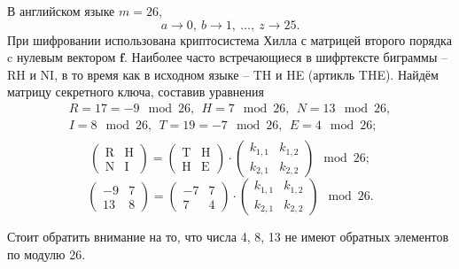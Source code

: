 \example В английском языке $m = 26$,
    \[ a \rightarrow 0, ~ b \rightarrow 1, ~ \dots, ~ z \rightarrow 25. \]
При шифровании использована криптосистема Хилла с матрицей второго порядка c нулевым вектором $\mathbf{f}$. Наиболее часто встречающиеся в шифртексте биграммы -- RH и NI, в то время как в исходном языке -- TH и HE (артикль THE). Найдём матрицу секретного ключа, составив уравнения
\[
    \begin{array}{l}
        R = 17 = -9 \mod 26, ~~ H = 7 \mod 26, ~~ N = 13 \mod 26, \\
        I = 8 \mod 26, ~~ T = 19 = -7 \mod 26, ~~ E=4 \mod 26; \\
    \end{array}
\] \[
    \left( \begin{array}{cc}
        \text{R} & \text{H} \\
        \text{N} & \text{I}
    \end{array} \right) =
    \left( \begin{array}{cc}
        \text{T} & \text{H} \\
        \text{H} & \text{E}
    \end{array} \right) \cdot
    \left( \begin{array}{cc}
        k_{1,1} & k_{1,2} \\
        k_{2,1} & k_{2,2}
    \end{array} \right) \mod 26;
\] \[
    \left( \begin{array}{cc}
        -9 & 7 \\
        13 & 8
    \end{array} \right) =
    \left( \begin{array}{cc}
        -7 & 7 \\
        7 & 4
    \end{array} \right) \cdot
    \left( \begin{array}{cc}
        k_{1,1} & k_{1,2} \\
        k_{2,1} & k_{2,2}
    \end{array} \right) \mod 26.
\]

Стоит обратить внимание на то, что числа 4, 8, 13 не имеют обратных элементов по модулю 26.

